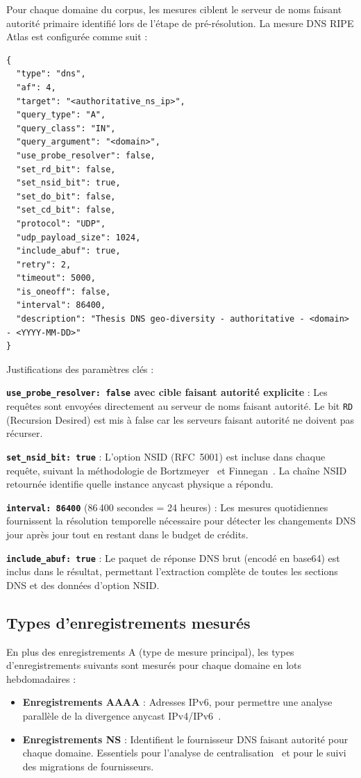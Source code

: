 Pour chaque domaine du corpus, les mesures ciblent le serveur de noms faisant autorité primaire identifié lors de l'étape de pré-résolution. La mesure DNS RIPE Atlas est configurée comme suit :

\begin{lstlisting}[style=json]
{
  "type": "dns",
  "af": 4,
  "target": "<authoritative_ns_ip>",
  "query_type": "A",
  "query_class": "IN",
  "query_argument": "<domain>",
  "use_probe_resolver": false,
  "set_rd_bit": false,
  "set_nsid_bit": true,
  "set_do_bit": false,
  "set_cd_bit": false,
  "protocol": "UDP",
  "udp_payload_size": 1024,
  "include_abuf": true,
  "retry": 2,
  "timeout": 5000,
  "is_oneoff": false,
  "interval": 86400,
  "description": "Thesis DNS geo-diversity - authoritative - <domain> - <YYYY-MM-DD>"
}
\end{lstlisting}

Justifications des paramètres clés :

\textbf{\texttt{use\_probe\_resolver: false} avec cible faisant autorité explicite} : Les requêtes sont envoyées directement au serveur de noms faisant autorité. Le bit \texttt{RD} (Recursion Desired) est mis à false car les serveurs faisant autorité ne doivent pas récurser.

\textbf{\texttt{set\_nsid\_bit: true}} : L'option NSID (RFC~5001) est incluse dans chaque requête, suivant la méthodologie de Bortzmeyer~\cite{Bortzmeyer2013} et Finnegan~\cite{Finnegan2018}. La chaîne NSID retournée identifie quelle instance anycast physique a répondu.

\textbf{\texttt{interval: 86400}} (86\,400 secondes = 24 heures) : Les mesures quotidiennes fournissent la résolution temporelle nécessaire pour détecter les changements DNS jour après jour tout en restant dans le budget de crédits.

\textbf{\texttt{include\_abuf: true}} : Le paquet de réponse DNS brut (encodé en base64) est inclus dans le résultat, permettant l'extraction complète de toutes les sections DNS et des données d'option NSID.

\subsection{Types d'enregistrements mesurés}
\label{subsec:3.3.3}

En plus des enregistrements A (type de mesure principal), les types d'enregistrements suivants sont mesurés pour chaque domaine en lots hebdomadaires :

\begin{itemize}
  \item \textbf{Enregistrements AAAA} : Adresses IPv6, pour permettre une analyse parallèle de la divergence anycast IPv4/IPv6~\cite{Bortzmeyer2013}.
  \item \textbf{Enregistrements NS} : Identifient le fournisseur DNS faisant autorité pour chaque domaine. Essentiels pour l'analyse de centralisation~\cite{Xu2023} et pour le suivi des migrations de fournisseurs.
\end{itemize}

